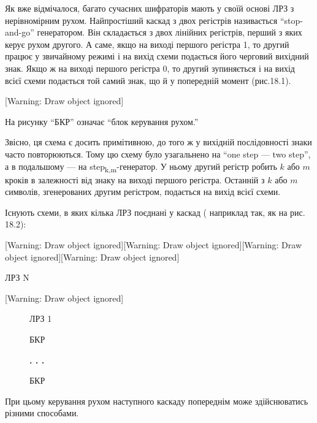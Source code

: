 {{Як вже відмічалося, багато сучасних шифраторів мають у своїй основі ЛРЗ з
нерівномірним рухом. Найпростіший каскад з двох регістрів називається
“stop{}-and{}-go” генератором. Він складається з двох лінійних регістрів,
перший з яких керує рухом другого. А саме, якщо на виході першого регістра 1,
то другий працює у звичайному режимі і на вихід схеми подається його черговий
вихідний знак. Якщо ж на виході першого регістра 0, то другий зупиняється і на
вихід всієї схеми  подається той самий знак, що й у попередній момент
(рис.18.1).

[Warning: Draw object ignored]

На рисунку “БКР” означає “блок керування рухом.”

Звісно, ця схема є досить примітивною, до того ж у вихідній послідовності знаки
часто повторюються. Тому цю схему було узагальнено на “one step --- two step”, а
в подальшому --- на 
step\textsubscript{k}\textsubscript{,}\textsubscript{m}{}-генератор. У ньому
другий регістр робить  $k$ або  $m$ кроків в залежності від знаку на виході
першого регістра. Останній з  $k$ або  $m$ символів, згенерованих другим
регістром, подається на вихід всієї схеми.

Існують схеми, в яких кілька ЛРЗ поєднані у каскад ( наприклад так, як на рис.
18.2):


\bigskip

[Warning: Draw object ignored][Warning: Draw object ignored][Warning: Draw
object ignored][Warning: Draw object ignored]\begin{minipage}{1.0098in}

\bigskip
\end{minipage}\begin{minipage}{1.0091in}
 ЛРЗ N
\end{minipage}[Warning: Draw object ignored]

\begin{figure}
\centering
\begin{minipage}{1.0098in}
 ЛРЗ 1
\end{minipage}
\end{figure}
\begin{figure}
\centering
\begin{minipage}{0.5299in}
БКР
\end{minipage}
\end{figure}
\begin{figure}
\centering
\begin{minipage}{0.5083in}
{\bfseries
. . .}
\end{minipage}
\end{figure}
\begin{figure}
\centering
\begin{minipage}{0.5299in}
БКР
\end{minipage}
\end{figure}
При цьому керування рухом наступного каскаду попереднім може здійснюватись
різними способами. 

}}

